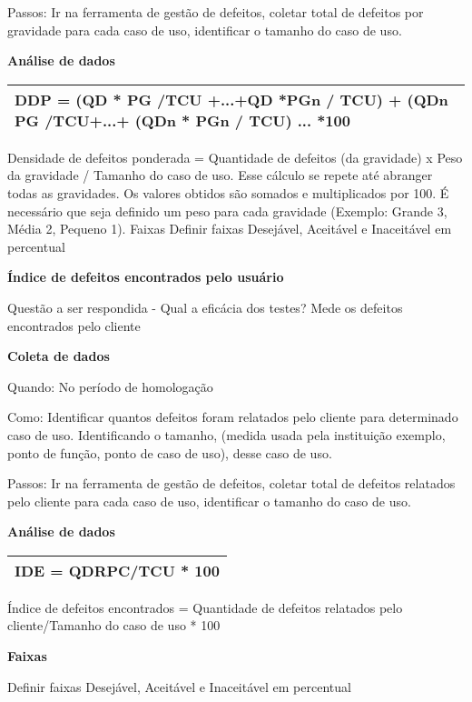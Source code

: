 Passos: Ir na ferramenta de gestão de defeitos, coletar total de defeitos por gravidade para cada caso de uso, identificar o tamanho do caso de uso.

\textbf{Análise de dados}

\begin{table}[!ht]
\centering
\begin{tabular}{|p{130mm}|}
\hline
DDP = (QD * PG /TCU +...+QD *PGn / TCU) + (QDn PG /TCU+...+ (QDn * PGn / TCU) ... *100 \\ 
\hline
\end{tabular}
\end{table}

Densidade de defeitos ponderada = Quantidade de defeitos (da gravidade) x Peso da gravidade / Tamanho do caso de uso. Esse cálculo se repete até abranger todas as gravidades. Os valores obtidos são somados e multiplicados por 100. É necessário que seja definido um peso para cada gravidade (Exemplo: Grande 3, Média 2, Pequeno 1). Faixas Definir faixas Desejável, Aceitável e Inaceitável em percentual

\textbf{Índice de defeitos encontrados pelo usuário}

Questão a ser respondida - Qual a eficácia dos testes? Mede os defeitos encontrados pelo cliente

\textbf{Coleta de dados}

Quando: No período de homologação 

Como: Identificar quantos defeitos foram relatados pelo cliente para determinado caso de uso. Identificando o tamanho, (medida usada pela instituição exemplo, ponto de função, ponto de caso de uso), desse caso de uso. 

Passos: Ir na ferramenta de gestão de defeitos, coletar total de defeitos relatados pelo cliente para cada caso de uso, identificar o tamanho do caso de uso.



\textbf{Análise de dados}

\begin{tabular}{|l|}
\hline
IDE = QDRPC/TCU * 100 \\ 
\hline
\end{tabular}

Índice de defeitos encontrados = Quantidade de defeitos relatados pelo cliente/Tamanho do caso de uso * 100

\textbf{Faixas}

Definir faixas Desejável, Aceitável e Inaceitável em percentual


